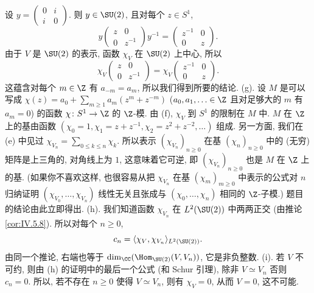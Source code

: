 \begin{solution}
\[\]
设 $y = \begin{pmatrix} 0 & i \\ i & 0 \end{pmatrix}$. 则 $y \in \SU(2)$, 且对每个 $z \in S^1$,
\[
y\begin{pmatrix} z & 0 \\ 0 & z^{-1} \end{pmatrix}y^{-1} = \begin{pmatrix} z^{-1} & 0 \\ 0 & z \end{pmatrix}.
\]
由于 $V$ 是 $\SU(2)$ 的表示, 函数 $\chi_V$ 在 $\SU(2)$ 上中心, 所以
\[
\chi_V\begin{pmatrix} z & 0 \\ 0 & z^{-1} \end{pmatrix} = \chi_V\begin{pmatrix} z^{-1} & 0 \\ 0 & z \end{pmatrix}.
\]
这蕴含对每个 $m \in \Z$ 有 $a_{-m} = a_m$, 所以我们得到所要的结论.
(g). 设 $M$ 是可以写成 $\chi(z) = a_0 + \sum_{m \geq 1}a_m(z^m + z^{-m})$ ($a_0, a_1, \ldots \in \Z$ 且对足够大的 $m$ 有 $a_m = 0$) 的函数 $\chi \colon S^1 \to \Z$ 的 $\Z$-模. 由 (f), $\chi_V$ 到 $S^1$ 的限制在 $M$ 中.
$M$ 在 $\Z$ 上的基由函数 $(\chi_0 = 1, \chi_1 = z + z^{-1}, \chi_2 = z^2 + z^{-2}, \ldots)$ 组成. 另一方面, 我们在 (e) 中见过 $\chi_{V_n} = \sum_{0 \leq k \leq n}\chi_k$. 所以表示 $(\chi_{V_n})_{n \geq 0}$ 在基 $(\chi_n)_{n \geq 0}$ 中的 (无穷) 矩阵是上三角的, 对角线上为 $1$, 这意味着它可逆, 即 $(\chi_{V_n})_{n \geq 0}$ 也是 $M$ 在 $\Z$ 上的基. (如果你不喜欢这样, 也很容易从把 $\chi_{V_n}$ 在基 $(\chi_m)_{m \geq 0}$ 中表示的公式对 $n$ 归纳证明 $(\chi_{V_0}, \ldots, \chi_{V_n})$ 线性无关且张成与 $(\chi_0, \ldots, \chi_n)$ 相同的 $\Z$-子模.)
题目的结论由此立即得出.
(h). 我们知道函数 $\chi_{V_n}$ 在 $L^2(\SU(2))$ 中两两正交 (由推论 \ref{cor:IV.5.8}). 所以对每个 $n \geq 0$,
\[
c_n = \langle \chi_V, \chi_{V_n} \rangle_{L^2(\SU(2))}.
\]
由同一个推论, 右端也等于 $\dim_{\CC}(\Hom_{\SU(2)}(V, V_n))$, 它是非负整数.
(i). 若 $V$ 不可约, 则由 (h) 的证明中的最后一个公式 (和 Schur 引理), 除非 $V \simeq V_n$ 否则 $c_n = 0$. 所以, 若不存在 $n \geq 0$ 使得 $V \simeq V_n$, 则有 $\chi_V = 0$, 从而 $V = 0$, 这不可能.
\end{solution}

